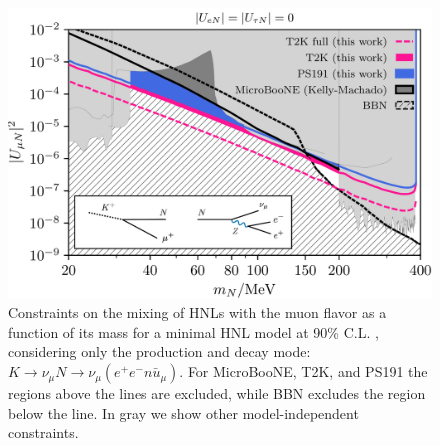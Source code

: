 \documentclass[
reprint,
superscriptaddress,
showpacs,
preprintnumbers,
bibnotes,
amsmath,
amssymb,
aps,
prd,
floatfix
]{revtex4-2}
\begin{document}

\begin{figure}[t]
    \centering
    \includegraphics[width=\columnwidth]{figures/Fig-1.pdf}
    \caption{Constraints on the mixing of HNLs with the muon flavor as a function of its mass for a minimal HNL model at 90\% C.L. , considering only the production and decay mode: $K \rightarrow \nu_{\mu} N \rightarrow \nu_{\mu} (e^+e^-\bar{nu_{\mu}})$.
    For MicroBooNE, T2K, and PS191 the regions above the lines are excluded, while BBN excludes the region below the line. In gray we show other model-independent constraints.
    \label{fig:minimal}}
\end{figure}
\end{document}
